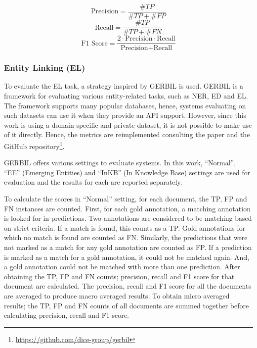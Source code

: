 \documentclass{report}
\theoremstyle{definition}
\theoremstyle{remark}
\begin{document}
\begin{equation}
\label{eq:pr}
    \text{Precision} = \frac{\#TP}{\#TP+\#FP} 
\end{equation}
\begin{equation}
\label{eq:re}
    \text{Recall} = \frac{\#TP}{\#TP+\#FN} 
\end{equation}
\begin{equation}
\label{eq:f1}
    \text{F1 Score} = \frac{2\cdot\text{Precision}\cdot\text{Recall}}{\text{Precision}+\text{Recall}} 
\end{equation}

\subsubsection{Entity Linking (EL)}
To evaluate the EL task, a strategy inspired by GERBIL \cite{gerbil} is used. GERBIL is a framework for evaluating various entity-related tasks, such as NER, ED and EL. The framework supports many popular databases, hence, systems evaluating on such datasets can use it when they provide an API support. However, since this work is using a domain-specific and private dataset, it is not possible to make use of it directly. Hence, the metrics are reimplemented consulting the paper \cite{gerbil} and the GitHub repository\footnote{\url{https://github.com/dice-group/gerbil}}. 

GERBIL offers various settings to evaluate systems. In this work, ``Normal'', ``EE'' (Emerging Entities) and ``InKB'' (In Knowledge Base) settings are used for evaluation and the results for each are reported separately. 

To calculate the scores in ``Normal'' setting, for each document, the TP, FP and FN instances are counted. First, for each gold annotation, a matching annotation is looked for in predictions. Two annotations are considered to be matching based on strict criteria. If a match is found, this counts as a TP. Gold annotations for which no match is found are counted as FN. Similarly, the predictions that were not marked as a match for any gold annotation are counted as FP. If a prediction is marked as a match for a gold annotation, it could not be matched again. And, a gold annotation could not be matched with more than one prediction. After obtaining the TP, FP and FN counts; precision, recall and F1 score for that document are calculated. The precision, recall and F1 score for all the documents are averaged to produce macro averaged results. To obtain micro averaged results; the TP, FP and FN counts of all documents are summed together before calculating precision, recall and F1 score. 
\end{document}
